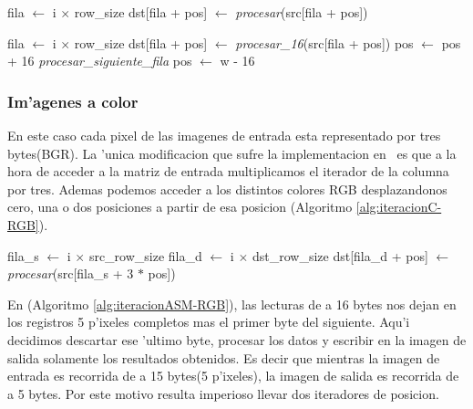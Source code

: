 \begin{algorithm}[h!]
\caption{}\label{alg:iteracionC-BN}
\begin{algorithmic}[1]
	\STATE fila $\leftarrow$ i $\times$ row\_size
		\STATE dst[fila + pos] $\leftarrow$ \textit{procesar}(src[fila + pos])
	\ENDFOR
\ENDFOR
\end{algorithmic}
\end{algorithm}

\begin{algorithm}[h!]
\caption{}\label{alg:iteracionASM-BN}
\begin{algorithmic}[1]
	\STATE fila $\leftarrow$ i $\times$ row\_size
		\STATE dst[fila + pos] $\leftarrow$ \textit{procesar_{16}}(src[fila + pos])
		\STATE pos $\leftarrow$ pos + 16		
			\STATE \textit{procesar\_siguiente\_fila}
			\STATE pos $\leftarrow$ w - 16
		\ENDIF
		
	\ENDFOR
\ENDFOR
\end{algorithmic}
\end{algorithm}

\subsubsection{Im'agenes a color}
\label{sec:ciclos-color}
En este caso cada pixel de las imagenes de entrada esta representado por tres bytes(BGR). La 'unica modificacion que sufre la implementacion en \C\ es que a la hora de acceder a la matriz de entrada multiplicamos el iterador de la columna por tres. Ademas podemos acceder a los distintos colores RGB desplazandonos cero, una o dos posiciones a partir de esa posicion (Algoritmo \ref{alg:iteracionC-RGB}).


\begin{algorithm}[h!]
\caption{}\label{alg:iteracionC-RGB}
\begin{algorithmic}[1]
	\STATE fila_s $\leftarrow$ i $\times$ src\_row\_size	
	\STATE fila_d $\leftarrow$ i $\times$ dst\_row\_size
		\STATE dst[fila_d + pos] $\leftarrow$ \textit{procesar}(src[fila_s + 3 $*$ pos])
	\ENDFOR
\ENDFOR
\end{algorithmic}
\end{algorithm}

En \ass (Algoritmo \ref{alg:iteracionASM-RGB}), las lecturas de a 16 bytes nos dejan en los registros 5 p'ixeles completos mas el primer byte del siguiente. Aqu'i decidimos descartar ese 'ultimo byte, procesar los datos y escribir en la imagen de salida solamente los resultados obtenidos. Es decir que mientras la imagen de entrada es recorrida de a 15 bytes(5 p'ixeles), la imagen de salida es recorrida de a 5 bytes. Por este motivo resulta imperioso llevar dos iteradores de posicion.

